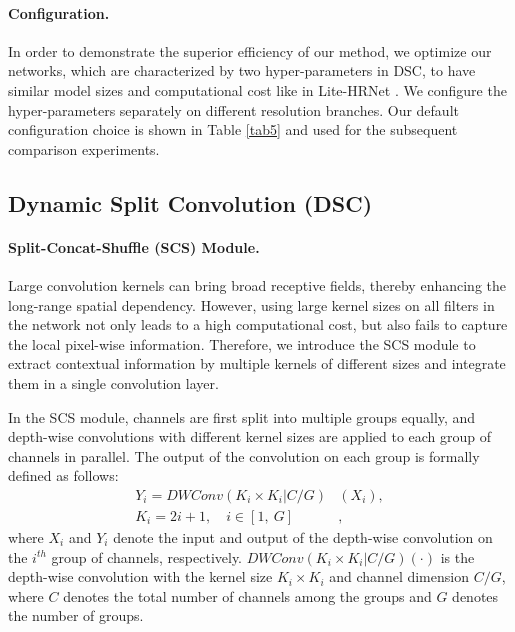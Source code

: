 \documentclass{article}
\begin{document}
\paragraph{Configuration.} In order to demonstrate the superior efficiency of our method, we optimize our networks, which are characterized by two hyper-parameters in DSC, to have similar model sizes and computational cost like in Lite-HRNet \cite{yu:litehrnet}. We configure the hyper-parameters separately on different resolution branches. Our default configuration choice is shown in Table \ref{tab5} and used for the subsequent comparison experiments. 

\subsection{Dynamic Split Convolution (DSC)}

\paragraph{Split-Concat-Shuffle (SCS) Module.} Large convolution kernels can bring broad receptive fields, thereby enhancing the long-range spatial dependency. However, using large kernel sizes on all filters in the network not only leads to a high computational cost, but also fails to capture the local pixel-wise information. Therefore, we introduce the SCS module to extract contextual information by multiple kernels of different sizes and integrate them in a single convolution layer.

In the SCS module, channels are first split into multiple groups equally, and depth-wise convolutions with different kernel sizes are applied to each group of channels in parallel. The output of the convolution on each group is formally defined as follows:
\begin{equation}
    \begin{split}
        Y_i = DWConv(K_i \times K_i|C/G) & (X_i),\\
        K_i = 2i + 1, \quad i \in [1, \ G] & ,
    \end{split}
\end{equation}where $X_i$ and $Y_i$ denote the input and output of the depth-wise convolution on the $i^{th}$ group of channels, respectively. $DWConv(K_i \times K_i|C/G)(\cdot)$ is the depth-wise convolution with the kernel size $K_i \times K_i$ and channel dimension $C/G$, where $C$ denotes the total number of channels among the groups and $G$ denotes the number of groups. 
\end{document}
